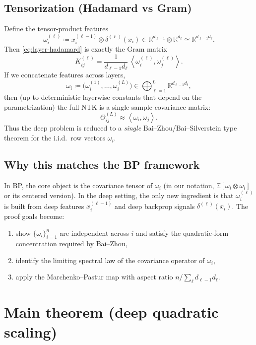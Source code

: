 \documentclass[11pt]{article}
\newcommand{\RR}{\mathbb{R}}
\newcommand{\EE}{\mathbb{E}}
\newcommand{\ip}[2]{\left\langle #1,#2\right\rangle}
\begin{document}
\subsection{Tensorization (Hadamard vs Gram)}
Define the tensor-product features
\begin{equation}\label{eq:omega-def}
  \omega_i^{(\ell)} \coloneqq x_i^{(\ell-1)}\otimes \delta^{(\ell)}(x_i)\in \RR^{d_{\ell-1}}\otimes \RR^{d_\ell}\simeq \RR^{d_{\ell-1}d_\ell}.
\end{equation}
Then \eqref{eq:layer-hadamard} is exactly the Gram matrix
\begin{equation}\label{eq:layer-gram}
  K^{(\ell)}_{ij}=\frac{1}{d_{\ell-1}d_\ell}\,\ip{\omega_i^{(\ell)}}{\omega_j^{(\ell)}}.
\end{equation}
If we concatenate features across layers,
\[
  \omega_i \coloneqq \bigl(\omega_i^{(1)},\dots,\omega_i^{(L)}\bigr)\in \bigoplus_{\ell=1}^L \RR^{d_{\ell-1}d_\ell},
\]
then (up to deterministic layerwise constants that depend on the parametrization) the full NTK is a single sample covariance matrix:
\begin{equation}\label{eq:full-gram}
  \Theta^{(L)}_{ij}
  \approx
  \ip{\omega_i}{\omega_j}.
\end{equation}
Thus the deep problem is reduced to a \emph{single} Bai--Zhou/Bai--Silverstein type theorem for the i.i.d.\ row vectors $\omega_i$.

\subsection{Why this matches the BP framework}
In BP, the core object is the covariance tensor of $\omega_i$ (in our notation, $\EE[\omega_i\otimes \omega_i]$ or its centered version).
In the deep setting, the only new ingredient is that $\omega_i^{(\ell)}$ is built from deep features $x_i^{(\ell-1)}$ and deep backprop signals $\delta^{(\ell)}(x_i)$.
The proof goals become:
\begin{enumerate}
  \item show $\{\omega_i\}_{i=1}^n$ are independent across $i$ and satisfy the quadratic-form concentration required by Bai--Zhou,
  \item identify the limiting spectral law of the covariance operator of $\omega_i$,
  \item apply the Marchenko--Pastur map with aspect ratio $n/\sum_{\ell} d_{\ell-1}d_\ell$.
\end{enumerate}

\section{Main theorem (deep quadratic scaling)}
\label{sec:main}
\end{document}
